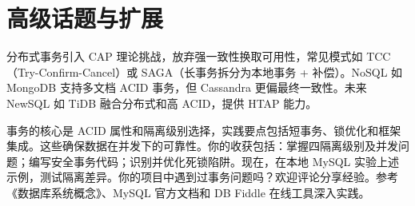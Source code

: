 \chapter{高级话题与扩展}
分布式事务引入 CAP 理论挑战，放弃强一致性换取可用性，常见模式如 TCC（Try-Confirm-Cancel）或 SAGA（长事务拆分为本地事务 + 补偿）。NoSQL 如 MongoDB 支持多文档 ACID 事务，但 Cassandra 更偏最终一致性。未来 NewSQL 如 TiDB 融合分布式和高 ACID，提供 HTAP 能力。\par
事务的核心是 ACID 属性和隔离级别选择，实践要点包括短事务、锁优化和框架集成。这些确保数据在并发下的可靠性。你的收获包括：掌握四隔离级别及并发问题；编写安全事务代码；识别并优化死锁陷阱。现在，在本地 MySQL 实验上述示例，测试隔离差异。你的项目中遇到过事务问题吗？欢迎评论分享经验。参考《数据库系统概念》、MySQL 官方文档和 DB Fiddle 在线工具深入实践。\par
